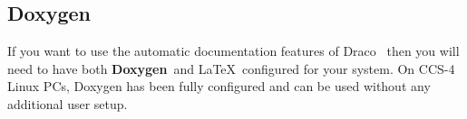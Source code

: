 \documentclass[10pt]{nmemo}
\newcommand{\comp}[1]{\normalfont\normalsize\texttt{#1}}
\newcommand{\draco}{{\normalfont\sffamily Draco}}
\newcommand{\doxygen}{{\normalfont\bfseries Doxygen}}
\begin{document}


%






\subsection{Doxygen}
\label{doxygen}

If you want to use the automatic documentation features of
\draco~\cite{doxygen} then you will need to have both \doxygen\ and
\LaTeX\ configured for your system.  On CCS-4 Linux PCs, Doxygen has
been fully configured and can be used without any additional user
setup. 
\end{document}

